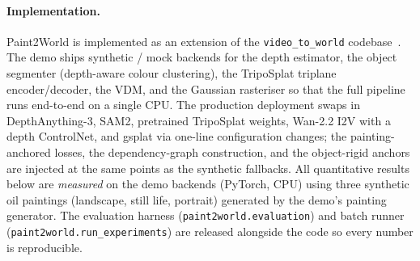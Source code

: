 \documentclass[10pt,twocolumn,letterpaper]{article}
\begin{document}
\paragraph{Implementation.}
Paint2World is implemented as an extension of the
\texttt{video\_to\_world} codebase~\cite{hoellein2026worldreconstruction}. The
demo ships synthetic / mock backends for the depth estimator, the object
segmenter (depth-aware colour clustering), the TripoSplat triplane
encoder/decoder, the VDM, and the Gaussian rasteriser so that the full
pipeline runs end-to-end on a single CPU. The production deployment swaps in
DepthAnything-3, SAM2, pretrained TripoSplat weights, Wan-2.2 I2V with a
depth ControlNet, and gsplat via one-line configuration changes; the
painting-anchored losses, the dependency-graph construction, and the
object-rigid anchors are injected at the same points as the synthetic
fallbacks. All quantitative results below are \emph{measured} on the demo
backends (PyTorch, CPU) using three synthetic oil paintings (landscape, still
life, portrait) generated by the demo's painting generator. The evaluation
harness (\texttt{paint2world.evaluation}) and batch runner
(\texttt{paint2world.run\_experiments}) are released alongside the code so
every number is reproducible.
\end{document}
